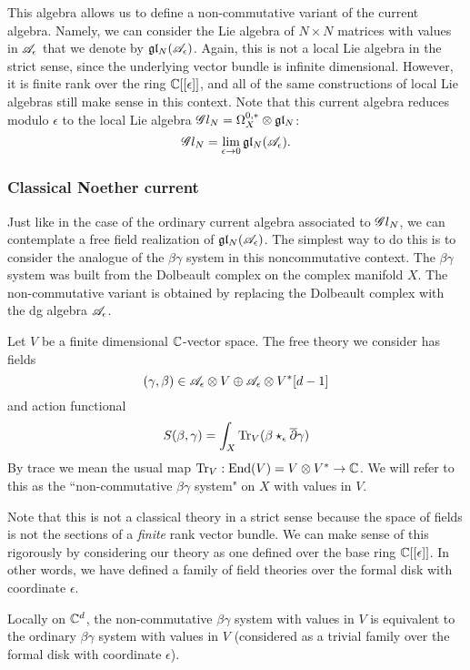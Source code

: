 This algebra allows us to define a non-commutative variant of the current algebra. 
Namely, we can consider the Lie algebra of $N \times N$ matrices with values in $\mathscr A_\epsilon$ that we denote by $\mathfrak{g} \mathfrak{l}_N(\mathscr A_{\epsilon})$. 
Again, this is not a local Lie algebra in the strict sense, since the underlying vector bundle is infinite dimensional. 
However, it is finite rank over the ring $\mathbb C[[\epsilon]]$, and all of the same constructions of local Lie algebras still make sense in this context. 
Note that this current algebra reduces modulo $\epsilon$ to the local Lie algebra $\mathscr G l_N = \Omega^{0,*}_X \otimes \mathfrak{g} \mathfrak{l}_N$:
\[
\mathscr G l_N = \lim_{\epsilon \to 0} \mathfrak{g} \mathfrak{l}_N(\mathscr A_{\epsilon})  .
\]

\subsubsection{Classical Noether current}

Just like in the case of the ordinary current algebra associated to $\mathscr G l_N$, we can contemplate a free field realization of $\mathfrak{g} \mathfrak{l}_N(\mathscr A_{\epsilon})$.
The simplest way to do this is to consider the analogue of the $\beta\gamma$ system in this noncommutative context. 
The $\beta\gamma$ system was built from the Dolbeault complex on the complex manifold $X$. 
The non-commutative variant is obtained by replacing the Dolbeault complex with the dg algebra $\mathscr A_\epsilon$. 

Let $V$ be a finite dimensional $\mathbb C$-vector space.
The free theory we consider has fields 
\[
(\gamma, \beta) \in \mathscr A_\epsilon \otimes V \oplus \mathscr A_\epsilon \otimes V^* [d-1] 
\]
and action functional
\[
S(\beta,\gamma) = \int_X {\rm Tr}_V(\beta \star_{\epsilon} \overline{\partial} \gamma)
\]
By trace we mean the usual map ${\rm Tr}_V : {\rm End}(V) = V \otimes V^* \to \mathbb C$. 
We will refer to this as the ``non-commutative $\beta\gamma$ system" on $X$ with values in $V$.

\begin{rmk}
Note that this is not a classical theory in a strict sense because the space of fields is not the sections of a {\em finite} rank vector bundle. 
We can make sense of this rigorously by considering our theory as one defined over the base ring $\mathbb C[[\epsilon]]$. 
In other words, we have defined a family of field theories over the formal disk with coordinate $\epsilon$. 
\end{rmk}

\begin{lem}
Locally on $\mathbb C^d$, the non-commutative $\beta\gamma$ system with values in $V$ is equivalent to the ordinary $\beta\gamma$ system with values in $V$ (considered as a trivial family over the formal disk with coordinate $\epsilon$). 
\end{lem}


